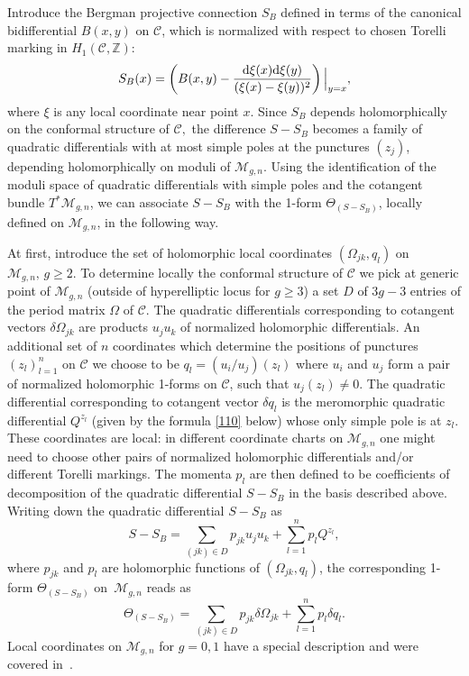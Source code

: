\documentclass[pdftex]{sigma}
\numberwithin{equation}{section}
\theoremstyle{definition}
\newcommand{\Z}{\mathbb{Z}}
\begin{document}
Introduce the Bergman projective connection $S_B$ defined in terms of the canonical bidifferential $B(x,y)$ on $\mathcal{C}$, which is normalized with respect to chosen Torelli marking in $H_1(\mathcal{C},\Z)$:%
\begin{equation}\label{12}
 S_B(x)=\left(B(x,y)-\frac{{\rm d}\xi(x) {\rm d}\xi(y)}{(\xi(x)-\xi(y))^2}\right)\Big|_{y=x},
\end{equation}
where $\xi$ is any local coordinate near point $x.$ Since $S_B$ depends holomorphically on the conformal structure of $\mathcal{C},$ the difference $S-S_B$ becomes
a family of quadratic differentials with at most simple poles at the punctures $(z_j)$, depending holomorphically on moduli of $\mathcal{M}_{g,n}.$ Using the identification of the moduli space of quadratic differentials with simple poles and the cotangent bundle $T^*\mathcal{M}_{g,n}$, we can associate $S-S_B$ with the 1-form $\Theta_{(S-S_B)}$, locally defined on $\mathcal{M}_{g,n}$, in the following way.

At first, introduce the set of holomorphic local coordinates $(\Omega_{jk}, q_l)$ on $\mathcal{M}_{g,n}, \, g \geq 2$. To determine locally the
conformal structure of $\mathcal{C}$ we pick at generic point of $\mathcal{M}_{g,n}$ (outside of hyperelliptic locus for $g \geq 3$) a set $D$ of $3g-3$ entries of the
period matrix $\Omega$ of $\mathcal{C}.$ The quadratic differentials corresponding to cotangent vectors $\delta \Omega_{jk} $ are products $u_j u_k$ of normalized
holomorphic differentials. An additional set of $n$ coordinates which determine the positions of punctures $(z_l)^n_{l=1} $
on $\mathcal{C}$ we choose to be $q_l = (u_i/u_j )(z_l)$ where $u_i$ and $u_j$ form a pair of normalized holomorphic 1-forms on
$\mathcal{C}$, such that $u_j(z_l) \neq 0$. The quadratic differential corresponding to cotangent vector $\delta q_l$ is the meromorphic quadratic
differential $Q^{z_l}$ (given by the formula \eqref{110} below) whose only simple pole is at $z_l$. These coordinates are local: in different coordinate charts on
$\mathcal{M}_{g,n}$ one might need to choose other pairs of normalized holomorphic differentials and/or different Torelli
markings. The momenta $p_l$ are then defined
to be coefficients of decomposition of the quadratic differential $S-S_B$ in the
basis described above.
Writing down the quadratic differential $S-S_B$ as
\begin{equation*}
S-S_B=\sum_{(jk) \in D}p_{jk} u_j u_k+ \sum^n_{l=1} p_l Q^{z_l},
\end{equation*}
where $p_{jk}$ and $p_l$ are holomorphic functions of $(\Omega_{jk},q_l)$, the corresponding 1-form $\Theta_{(S-S_B)}$ on~$\mathcal{M}_{g,n}$ reads as
\begin{equation}\label{form}\Theta_{(S-S_B)}=\sum_{(jk) \in D}p_{jk} \delta \Omega_{jk}+ \sum^n_{l=1} p_l \delta q_l.\end{equation}
Local coordinates on $\mathcal{M}_{g,n}$ for $ g=0, 1$ have a special description and were covered in~\cite{korotkin2018periods}.
\end{document}
